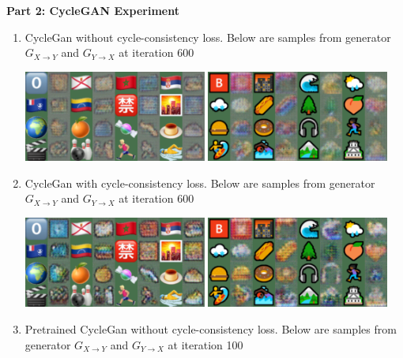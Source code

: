 \documentclass[11pt]{article}
\begin{document}
\textbf{Part 2: CycleGAN Experiment}
\begin{enumerate}
    \item CycleGan without cycle-consistency loss. Below are samples from generator $G_{X\rightarrow Y}$ and $G_{Y\rightarrow X}$ at iteration 600 
    \begin{center}
        \includegraphics[width=6cm]{../samples_cyclegan/sample-000600-X-Y.png}
        \includegraphics[width=6cm]{../samples_cyclegan/sample-000600-Y-X.png}
    \end{center}
    \item CycleGan with cycle-consistency loss. Below are samples from generator $G_{X\rightarrow Y}$ and $G_{Y\rightarrow X}$ at iteration 600
    \begin{center}
        \includegraphics[width=6cm]{../samples_cyclegan_cycle/sample-000600-X-Y.png}
        \includegraphics[width=6cm]{../samples_cyclegan_cycle/sample-000600-Y-X.png}
    \end{center}
    \item Pretrained CycleGan without cycle-consistency loss. Below are samples from generator $G_{X\rightarrow Y}$ and $G_{Y\rightarrow X}$ at iteration 100
    \begin{center}

\end{center}
\end{enumerate}
\end{document}
